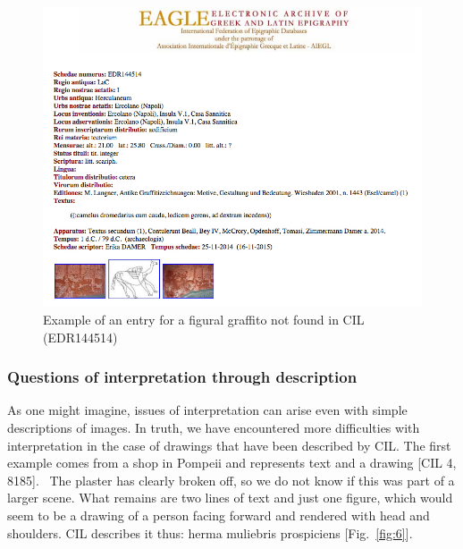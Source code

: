 \documentclass[amsthm,ebook]{saparticle}
\begin{document}
\begin{figure}[!bp]
\centering
 \includegraphics[width=\columnwidth]{EAGLE2016BenefielSypniewski-img005.jpg}
\caption{Example of an entry for a figural graffito not found in CIL (EDR144514)}
\label{fig:5}
\end{figure}



\subsubsection{Questions of interpretation through description}


As one might imagine, issues of interpretation can arise even with simple descriptions of images. In truth, we have
encountered more difficulties with interpretation in the case of drawings that have been described by CIL. The first
example comes from a shop in Pompeii and represents text and a drawing [CIL 4, 8185]. \ The plaster has clearly broken
off, so we do not know if this was part of a larger scene. What remains are two lines of text and just one figure,
which would seem to be a drawing of a person facing forward and rendered with head and shoulders. CIL describes it
thus: herma muliebris prospiciens [Fig.~\ref{fig:6}].
\end{document}
